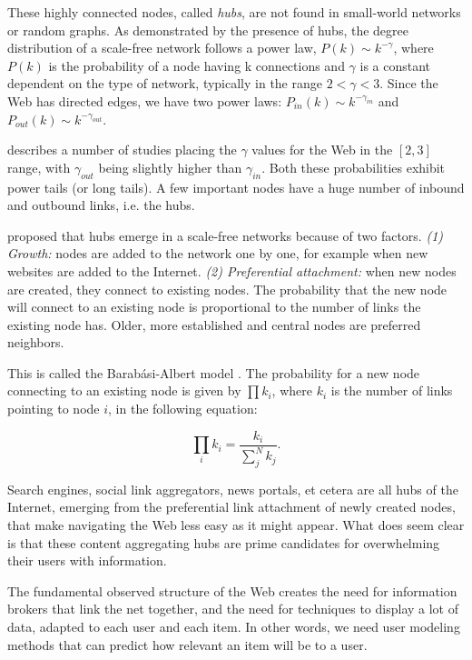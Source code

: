 These highly connected nodes, called \emph{hubs}, are not found in small-world networks or random graphs. As demonstrated by the presence of hubs, the degree distribution of a scale-free network follows a power law, 
$P(k) \sim k^{-\gamma}$, 
where $P(k)$ is the probability of a node having k connections and $\gamma$ is a constant dependent on the type of network, typically in the range $2 < \gamma < 3$. 
Since the Web has directed edges,
we have two power laws:
$P_{in}(k) \sim k^{-\gamma_{in}}$ and 
$P_{out}(k) \sim k^{-\gamma_{out}}$.

\cite{Albert1999} describes a number of studies placing the $\gamma$ values for the Web in the $[2,3]$ range, 
with $\gamma_{out}$ being slightly higher than $\gamma_{in}$. 
Both these probabilities exhibit power tails (or long tails). 
A few important nodes have a huge number of inbound and outbound links, i.e. the hubs. 

\citet[p.86]{Barabasi2003} proposed that hubs emerge in a scale-free networks because of two factors.
\emph{(1) Growth:} nodes are added to the network one by one, for example when new websites are added to the Internet.
\emph{(2) Preferential attachment:} when new nodes are created, they connect to existing nodes. The probability that the new node will connect to an existing node is proportional to the number of links the existing node has. Older, more established and central nodes are preferred neighbors.

This is called the Barab\'{a}si-Albert model \citep{Albert1999}. 
The probability for a new node connecting to an existing node is given by $\prod k_i$, 
where $k_i$ is the number of links pointing to node $i$, in the following equation: 

\begin{equation*}
  \prod_{i} k_i  = \frac{k_i}{\sum_{j}^N k_j}.
\end{equation*} 

Search engines, social link aggregators, news portals, et cetera are all hubs of the Internet, emerging from the preferential 
link attachment of newly created nodes, that make navigating the Web less easy as it might appear.
What does seem clear is that these content aggregating hubs are prime candidates for overwhelming their users with information. 

The fundamental observed structure of the Web creates the need for information brokers that link the net together, 
and the need for techniques to display a lot of data, adapted to each user and each item.
In other words, we need user modeling methods that can predict how relevant an item will be to a user.


 


